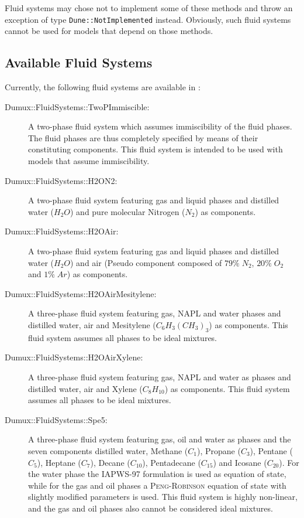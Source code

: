 Fluid systems may chose not to implement some of these methods and
throw an exception of type \lstinline{Dune::NotImplemented} instead. Obviously,
such fluid systems cannot be used for models that depend on those
methods.

\subsection{Available Fluid Systems}

Currently, the following fluid systems are available in \Dumux:
\begin{description}
\item[Dumux::FluidSystems::TwoPImmiscible:] A two-phase fluid system
  which assumes immiscibility of the fluid phases. The fluid phases
  are thus completely specified by means of their constituting
  components. This fluid system is intended to be used with models
  that assume immiscibility.
\item[Dumux::FluidSystems::H2ON2:] A two-phase fluid system featuring
  gas and liquid phases and distilled water ($H_2O$) and pure
  molecular Nitrogen ($N_2$) as components.
\item[Dumux::FluidSystems::H2OAir:] A two-phase fluid system
  featuring gas and liquid phases and distilled water ($H_2O$) and
  air (Pseudo component composed of $79\%\;N_2$, $20\%\;O_2$ and
  $1\%\;Ar$) as components.
\item[Dumux::FluidSystems::H2OAirMesitylene:] A three-phase fluid
  system featuring gas, NAPL and water phases and distilled water, air
  and Mesitylene ($C_6H_3(CH_3)_3$) as components. This fluid system
  assumes all phases to be ideal mixtures.
\item[Dumux::FluidSystems::H2OAirXylene:] A three-phase fluid system
  featuring gas, NAPL and water as phases and distilled water, air and
  Xylene ($C_8H_{10}$) as components. This fluid system assumes all
  phases to be ideal mixtures.
\item[Dumux::FluidSystems::Spe5:] A three-phase fluid system featuring
  gas, oil and water as phases and the seven components distilled
  water, Methane ($C_1$), Propane ($C_3$), Pentane ($C_5$), Heptane
  ($C_7$), Decane ($C_{10}$), Pentadecane ($C_{15}$) and Icosane
  ($C_{20}$). For the water phase the IAPWS-97 formulation is used as
  equation of state, while for the gas and oil phases a
  \textsc{Peng}-\textsc{Robinson} equation of state with slightly
  modified parameters is used. This fluid system is highly non-linear,
  and the gas and oil phases also cannot be considered ideal
  mixtures\cite{SPE5}.
\end{description}

